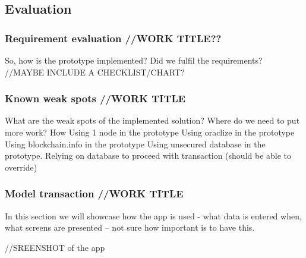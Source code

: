\subsection{Evaluation}

\subsubsection{Requirement evaluation //WORK TITLE??}

So, how is the prototype implemented? Did we fulfil the requirements? //MAYBE INCLUDE A CHECKLIST/CHART?

\subsubsection{Known weak spots //WORK TITLE}
What are the weak spots of the implemented solution? Where do we need to put more work? How
Using 1 node in the prototype
Using oraclize in the prototype
Using blockchain.info in the prototype
Using unsecured database in the prototype.
Relying on database to proceed with transaction (should be able to override)

\subsubsection{Model transaction //WORK TITLE}
% 
In this section we will showcase how the app is used - what data is entered when, what screens are presented -- not sure how important is to have this.

//SREENSHOT of the app

